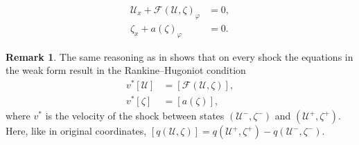 \documentclass[12pt]{article}
\theoremstyle{definition}
\newtheorem{remark}{Remark}
\begin{document}
\begin{align}
       \mathcal U_x + \mathcal F(\mathcal U,\zeta)_\varphi & = 0,\label{eq:U-lagr-eqn}\\
    \zeta_x + a(\zeta)_\varphi&=0. \label{eq:c-lagr-eqn}
\end{align}
\begin{remark}
The same reasoning as in \cite[Lemma 2.2.1]{Serre1} shows that on every shock the equations in the weak form result in the Rankine--Hugoniot condition
\begin{equation} 
\label{eq:RH-2}
\begin{split}
    v^*[\mathcal U]&=[\mathcal F(\mathcal U,\zeta)],
    \\
    v^*[\zeta]&=[a(\zeta)],
\end{split}
\end{equation} 
where $v^*$ is the velocity of the shock between states $(\mathcal U^-, \zeta^-)$ and $(\mathcal U^+, \zeta^+)$. Here, like in original coordinates, $[q(\mathcal U, \zeta)]=q(\mathcal U^+, \zeta^+)-q(\mathcal U^-, \zeta^-)$.
\end{remark}
\end{document}
